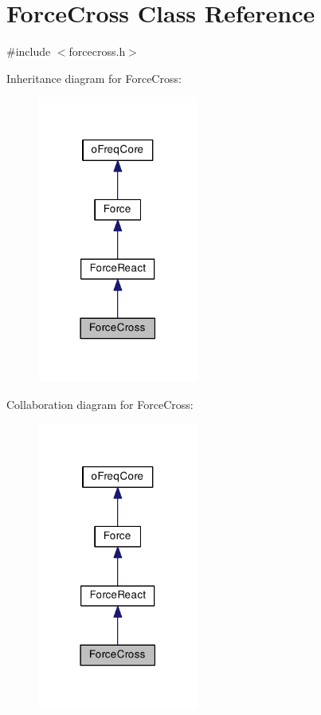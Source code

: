 \hypertarget{class_force_cross}{\section{Force\-Cross Class Reference}
\label{class_force_cross}
}


{\ttfamily \#include $<$forcecross.\-h$>$}



Inheritance diagram for Force\-Cross\-:\nopagebreak
\begin{figure}[H]
\begin{center}
\leavevmode
\includegraphics[width=150pt]{class_force_cross__inherit__graph}
\end{center}
\end{figure}


Collaboration diagram for Force\-Cross\-:\nopagebreak
\begin{figure}[H]
\begin{center}
\leavevmode
\includegraphics[width=150pt]{class_force_cross__coll__graph}
\end{center}
\end{figure}
